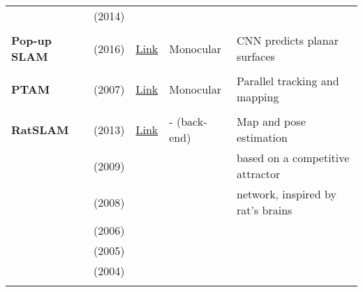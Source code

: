 \documentclass[a4paper,12pt]{scrartcl}
\begin{document}
{\begin{longtable}{l|l|l|l|l}
                           & \cite{Mur-Artal2014} (2014)       &                                                                    &                       &\\
                           &                                   &                                                                    &                       &\\
    \textbf{Pop-up SLAM}   & \cite{Yang2016} (2016)            & {\href{https://github.com/shichaoy/pop_up_image}{Link}}            & Monocular             & CNN predicts planar surfaces\\
                           &                                   &                                                                    &                       &\\
    \textbf{PTAM}          & \cite{Klein2007} (2007)           & {\href{https://github.com/Oxford-PTAM/PTAM-GPL}{Link}}             & Monocular             & Parallel tracking and mapping\\
                           &                                   &                                                                    &                       &\\
    \textbf{RatSLAM}       & \cite{Ball2013} (2013)            & {\href{https://github.com/davidmball/ratslam}{Link}}               & - (back-end)          & Map and pose estimation\\
                           & \cite{Maddern2009} (2009)         &                                                                    &                       & based on a competitive attractor\\
                           & \cite{Milford2008} (2008)         &                                                                    &                       & network, inspired by rat's brains\\
                           & \cite{Milford2006} (2006)         &                                                                    &                       &\\
                           & \cite{Milford2005} (2005)         &                                                                    &                       &\\
                           & \cite{Milford2004} (2004)         &                                                                    &                       &\\
                           &                                   &                                                                    &                       &\\

\end{longtable}}
\end{document}
